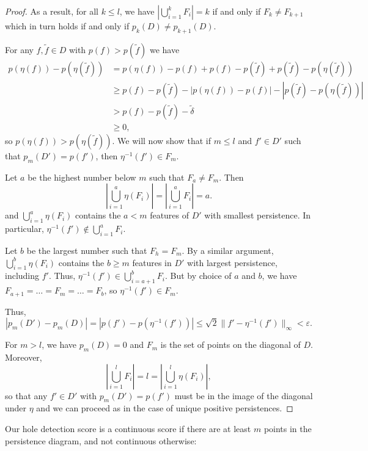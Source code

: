 \documentclass{article}
\theoremstyle{plain}
\theoremstyle{definition}
\theoremstyle{remark}
\begin{document}
\begin{proof}
    As a result, for all $k\leq l$, we have $|\bigcup_{i=1}^{k} F_i |= k$ if and only if $F_k \neq F_{k+1}$ which in turn holds if and only if $p_k(D) \neq p_{k+1}(D)$.

    For any $f, \tilde{f} \in D$ with $p(f) > p(\tilde{f})$ we have 
    \begin{align}
        p(\eta(f))- p(\eta(\tilde{f})) &= p(\eta(f))-p(f) + p(f) - p(\tilde{f}) + p(\tilde{f}) - p(\eta(\tilde{f})) \nonumber \\
        &\geq p(f) - p(\tilde{f}) - | p(\eta(f))-p(f)| - |p(\tilde{f}) - p(\eta(\tilde{f}))| \nonumber \\
        &> p(f) - p(\tilde{f}) - \tilde{\delta}\nonumber \\
        &\geq 0,
    \end{align}
    so $p(\eta(f)) > p(\eta(\tilde{f}))$. We will now show that if $m\leq l$  and $f'\in D'$ such that $p_m(D') = p(f')$, then $\eta^{-1}(f') \in F_m$.

    Let $a$ be the highest number below $m$ such that $F_a\neq F_m$. Then 
    $$
    \left|\bigcup_{i=1}^a \eta(F_i)\right| = \left|\bigcup_{i=1}^a F_i\right| = a.
    $$
    and $\bigcup_{i=1}^a \eta(F_i)$ contains the $a<m$ features of $D'$ with smallest persistence. In particular, \mbox{$\eta^{-1}(f') \notin \bigcup_{i=1}^a F_i$.}

    Let $b$ be the largest number such that $F_h = F_m$. By a similar argument, $\bigcup_{i=1}^b \eta(F_i)$ contains the $b\geq m$ features in $D'$ with largest persistence, including $f'$. Thus,  $\eta^{-1}(f')\in \bigcup_{i=a+1}^{b} F_i$. But by choice of $a$ and $b$, we have $F_{a+1} = \dots = F_m=\dots =F_b$, so $\eta^{-1}(f')\in F_m$.

    Thus, 
    $$
    |p_m(D') - p_m(D)| = |p(f') - p(\eta^{-1}(f'))| \leq \sqrt{2} \|f'-\eta^{-1}(f')\|_{\infty} < \varepsilon.
    $$

    For $m> l$, we have $p_m(D)=0$ and $F_m$ is the set of points on the diagonal of $D$. Moreover, 
    $$\left|\bigcup_{i=1}^l F_i\right| = l = \left|\bigcup_{i=1}^l \eta(F_i)\right|,$$
    so that any $f'\in D'$ with $p_m(D') = p(f')$ must be in the image of the diagonal under $\eta$ and we can proceed as in the case of unique positive persistences.
\end{proof}


Our hole detection score is a continuous score if there are at least $m$ points in the persistence diagram, and not continuous otherwise:
\end{document}
